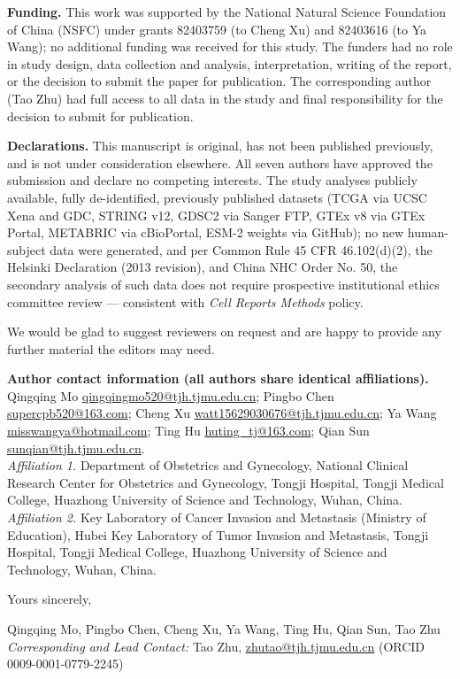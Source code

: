 \documentclass[11pt,a4paper]{article}
\begin{document}
\textbf{Funding.} This work was supported by the National Natural Science Foundation of China (NSFC) under grants 82403759 (to Cheng Xu) and 82403616 (to Ya Wang); no additional funding was received for this study. The funders had no role in study design, data collection and analysis, interpretation, writing of the report, or the decision to submit the paper for publication. The corresponding author (Tao Zhu) had full access to all data in the study and final responsibility for the decision to submit for publication.

\textbf{Declarations.} This manuscript is original, has not been published previously, and is not under consideration elsewhere. All seven authors have approved the submission and declare no competing interests. The study analyses publicly available, fully de-identified, previously published datasets (TCGA via UCSC Xena and GDC, STRING v12, GDSC2 via Sanger FTP, GTEx v8 via GTEx Portal, METABRIC via cBioPortal, ESM-2 weights via GitHub); no new human-subject data were generated, and per Common Rule 45 CFR 46.102(d)(2), the Helsinki Declaration (2013 revision), and China NHC Order No. 50, the secondary analysis of such data does not require prospective institutional ethics committee review --- consistent with \textit{Cell Reports Methods} policy.

\medskip
We would be glad to suggest reviewers on request and are happy to provide any further material the editors may need.

\medskip
\noindent\textbf{Author contact information (all authors share identical affiliations).}
Qingqing Mo \href{mailto:qingqingmo520@tjh.tjmu.edu.cn}{qingqingmo520@tjh.tjmu.edu.cn};
Pingbo Chen \href{mailto:supercpb520@163.com}{supercpb520@163.com};
Cheng Xu \href{mailto:watt15629030676@tjh.tjmu.edu.cn}{watt15629030676@tjh.tjmu.edu.cn};
Ya Wang \href{mailto:misswangya@hotmail.com}{misswangya@hotmail.com};
Ting Hu \href{mailto:huting_tj@163.com}{huting\_tj@163.com};
Qian Sun \href{mailto:sunqian@tjh.tjmu.edu.cn}{sunqian@tjh.tjmu.edu.cn}.\\
\textit{Affiliation 1.} Department of Obstetrics and Gynecology, National Clinical Research Center for Obstetrics and Gynecology, Tongji Hospital, Tongji Medical College, Huazhong University of Science and Technology, Wuhan, China.\\
\textit{Affiliation 2.} Key Laboratory of Cancer Invasion and Metastasis (Ministry of Education), Hubei Key Laboratory of Tumor Invasion and Metastasis, Tongji Hospital, Tongji Medical College, Huazhong University of Science and Technology, Wuhan, China.

\medskip
\noindent Yours sincerely,

\medskip
\noindent Qingqing Mo, Pingbo Chen, Cheng Xu, Ya Wang, Ting Hu, Qian Sun, Tao Zhu\\
\noindent\textit{Corresponding and Lead Contact:} Tao Zhu, \href{mailto:zhutao@tjh.tjmu.edu.cn}{zhutao@tjh.tjmu.edu.cn} (ORCID 0009-0001-0779-2245)
\end{document}
